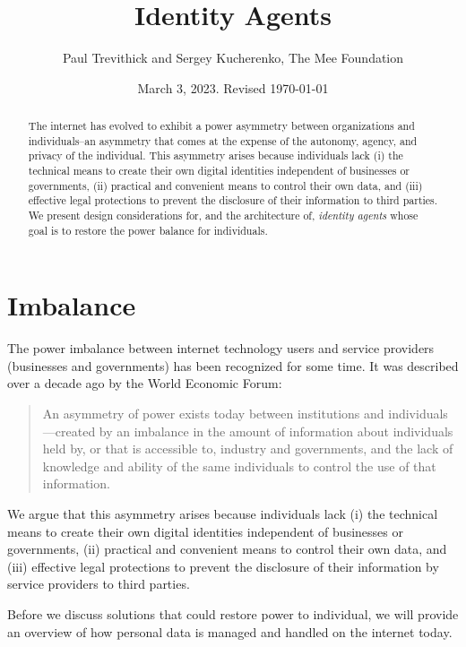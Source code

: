 \documentclass[11pt, oneside]{article}   	%
\title{Identity Agents}
\author{Paul Trevithick and Sergey Kucherenko, The Mee Foundation}
\date{March 3, 2023. Revised \today}
\begin{document}
\maketitle
\begin{abstract}
	The internet has evolved to exhibit a power asymmetry between organizations and individuals--an asymmetry that comes at the expense of the autonomy, agency, and privacy of the individual. This asymmetry arises because individuals lack (i) the technical means to create their own digital identities independent of businesses or governments, (ii) practical and convenient means to control their own data, and (iii) effective legal protections to prevent the disclosure of their information to third parties. We present design considerations for, and the architecture of, \emph{identity agents} whose goal is to restore the power balance for individuals.
\end{abstract}


\section{Imbalance} %

The power imbalance between internet technology users and service providers (businesses and governments) has been recognized for some time. It was described over a decade ago by the World Economic Forum\cite{Hoffman2014}:
\begin{quote}
	An asymmetry of power exists today between institutions and individuals---created by an imbalance in the amount of information about individuals held by, or that is accessible to, industry and governments, and the lack of knowledge and ability of the same individuals to control the use of that information. 
\end{quote}
We argue that this asymmetry arises because individuals lack (i) the technical means to create their own digital identities independent of businesses or governments, (ii) practical and convenient means to control their own data, and (iii) effective legal protections to prevent the disclosure of their information by service providers to third parties. 

Before we discuss solutions that could restore power to individual, we will provide an overview of how personal data is managed and handled on the internet today. 
\end{document}
